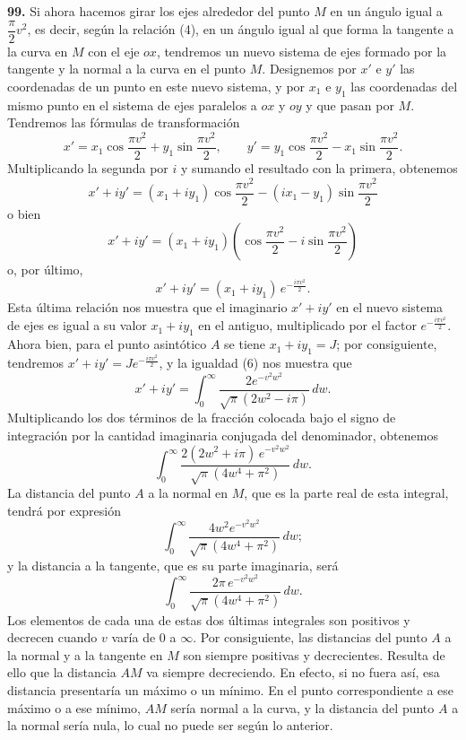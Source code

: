 \noindent\textbf{99.} Si ahora hacemos girar los ejes alrededor del
punto $M$ en un ángulo igual a $\dfrac{\pi}{2}v^2$, es decir, según la
relación (4), en un ángulo igual al que forma la tangente a la curva en
$M$ con el eje $ox$, tendremos un nuevo sistema de ejes formado por la
tangente y la normal a la curva en el punto $M$. Designemos por $x'$ e
$y'$ las coordenadas de un punto en este nuevo sistema, y por $x_1$ e
$y_1$ las coordenadas del mismo punto en el sistema de ejes paralelos a
$ox$ y $oy$ y que pasan por $M$. Tendremos las fórmulas de transformación
\[
x' = x_1\cos\frac{\pi v^2}{2} + y_1\sin\frac{\pi v^2}{2},\qquad
y' = y_1\cos\frac{\pi v^2}{2} - x_1\sin\frac{\pi v^2}{2}.
\]
Multiplicando la segunda por $i$ y sumando el resultado con la primera,
obtenemos
\[
x'+iy' = (x_1+iy_1)\cos\frac{\pi v^2}{2} - (ix_1-y_1)\sin\frac{\pi v^2}{2}
\]
o bien
\[
x'+iy' = (x_1+iy_1)\left(\cos\frac{\pi v^2}{2}-i\sin\frac{\pi v^2}{2}\right)
\]
o, por último,
\[
x'+iy' = (x_1+iy_1)\,e^{-\frac{i\pi v^2}{2}}.
\]
Esta última relación nos muestra que el imaginario $x'+iy'$ en el nuevo
sistema de ejes es igual a su valor $x_1+iy_1$ en el antiguo, multiplicado
por el factor $e^{-\frac{i\pi v^2}{2}}$. Ahora bien, para el punto
asintótico $A$ se tiene $x_1+iy_1=J$; por consiguiente, tendremos
$x'+iy'=Je^{-\frac{i\pi v^2}{2}}$, y la igualdad (6) nos muestra que
\begin{equation}
x'+iy' = \int_0^\infty \frac{2e^{-v^2w^2}}{\sqrt\pi\left(2w^2-i\pi\right)}\,dw.
\tag{7}
\end{equation}
Multiplicando los dos términos de la fracción colocada bajo el signo de
integración por la cantidad imaginaria conjugada del denominador,
obtenemos
\[
\int_0^\infty \frac{2(2w^2+i\pi)\,e^{-v^2w^2}}{\sqrt\pi(4w^4+\pi^2)}\,dw.
\]
La distancia del punto $A$ a la normal en $M$, que es la parte real de
esta integral, tendrá por expresión
\[
\int_0^\infty \frac{4w^2e^{-v^2w^2}}{\sqrt\pi(4w^4+\pi^2)}\,dw;
\]
y la distancia a la tangente, que es su parte imaginaria, será
\[
\int_0^\infty \frac{2\pi\,e^{-v^2w^2}}{\sqrt\pi(4w^4+\pi^2)}\,dw.
\]
Los elementos de cada una de estas dos últimas integrales son positivos y
decrecen cuando $v$ varía de $0$ a $\infty$. Por consiguiente, las
distancias del punto $A$ a la normal y a la tangente en $M$ son siempre
positivas y decrecientes. Resulta de ello que la distancia $AM$ va
siempre decreciendo. En efecto, si no fuera así, esa distancia
presentaría un máximo o un mínimo. En el punto correspondiente a ese
máximo o a ese mínimo, $AM$ sería normal a la curva, y la distancia del
punto $A$ a la normal sería nula, lo cual no puede ser según lo anterior.

